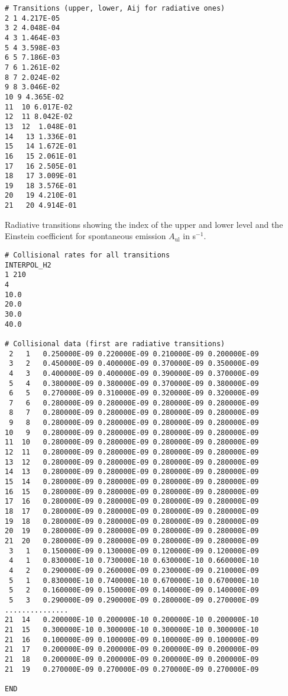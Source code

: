 \documentclass[12pt]{article}
\begin{document}
\begin{footnotesize} \begin{verbatim}
# Transitions (upper, lower, Aij for radiative ones)
2 1 4.217E-05
3 2 4.048E-04
4 3 1.464E-03
5 4 3.598E-03
6 5 7.186E-03
7 6 1.261E-02
8 7 2.024E-02
9 8 3.046E-02
10 9 4.365E-02
11  10 6.017E-02
12  11 8.042E-02
13  12  1.048E-01
14   13 1.336E-01
15   14 1.672E-01
16   15 2.061E-01
17   16 2.505E-01
18   17 3.009E-01
19   18 3.576E-01
20   19 4.210E-01
21   20 4.914E-01
\end{verbatim} \end{footnotesize}
Radiative transitions showing the index of the upper and lower level and the Einstein 
coefficient for spontaneous emission $A_\mathrm{ul}$ in s$^{-1}$.

\begin{footnotesize} \begin{verbatim}
# Collisional rates for all transitions
INTERPOL_H2
1 210
4
10.0
20.0
30.0
40.0

# Collisional data (first are radiative transitions)
 2   1   0.250000E-09 0.220000E-09 0.210000E-09 0.200000E-09
 3   2   0.450000E-09 0.400000E-09 0.370000E-09 0.350000E-09
 4   3   0.400000E-09 0.400000E-09 0.390000E-09 0.370000E-09
 5   4   0.380000E-09 0.380000E-09 0.370000E-09 0.380000E-09
 6   5   0.270000E-09 0.310000E-09 0.320000E-09 0.320000E-09
 7   6   0.280000E-09 0.280000E-09 0.280000E-09 0.280000E-09 
 8   7   0.280000E-09 0.280000E-09 0.280000E-09 0.280000E-09
 9   8   0.280000E-09 0.280000E-09 0.280000E-09 0.280000E-09
10   9   0.280000E-09 0.280000E-09 0.280000E-09 0.280000E-09  
11  10   0.280000E-09 0.280000E-09 0.280000E-09 0.280000E-09
12  11   0.280000E-09 0.280000E-09 0.280000E-09 0.280000E-09 
13  12   0.280000E-09 0.280000E-09 0.280000E-09 0.280000E-09
14  13   0.280000E-09 0.280000E-09 0.280000E-09 0.280000E-09
15  14   0.280000E-09 0.280000E-09 0.280000E-09 0.280000E-09
16  15   0.280000E-09 0.280000E-09 0.280000E-09 0.280000E-09
17  16   0.280000E-09 0.280000E-09 0.280000E-09 0.280000E-09
18  17   0.280000E-09 0.280000E-09 0.280000E-09 0.280000E-09
19  18   0.280000E-09 0.280000E-09 0.280000E-09 0.280000E-09
20  19   0.280000E-09 0.280000E-09 0.280000E-09 0.280000E-09
21  20   0.280000E-09 0.280000E-09 0.280000E-09 0.280000E-09   
 3   1   0.150000E-09 0.130000E-09 0.120000E-09 0.120000E-09
 4   1   0.830000E-10 0.730000E-10 0.630000E-10 0.660000E-10
 4   2   0.290000E-09 0.260000E-09 0.230000E-09 0.210000E-09
 5   1   0.830000E-10 0.740000E-10 0.670000E-10 0.670000E-10
 5   2   0.160000E-09 0.150000E-09 0.140000E-09 0.140000E-09
 5   3   0.290000E-09 0.290000E-09 0.280000E-09 0.270000E-09
...............
21  14   0.200000E-10 0.200000E-10 0.200000E-10 0.200000E-10
21  15   0.300000E-10 0.300000E-10 0.300000E-10 0.300000E-10
21  16   0.100000E-09 0.100000E-09 0.100000E-09 0.100000E-09
21  17   0.200000E-09 0.200000E-09 0.200000E-09 0.200000E-09
21  18   0.200000E-09 0.200000E-09 0.200000E-09 0.200000E-09
21  19   0.270000E-09 0.270000E-09 0.270000E-09 0.270000E-09

END
\end{verbatim} \end{footnotesize}
\end{document}

